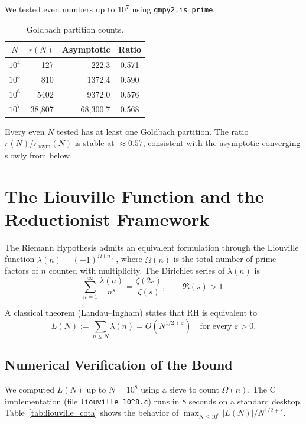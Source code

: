 \documentclass[12pt,a4paper]{article}
\theoremstyle{plain}
\begin{document}
We tested even numbers up to $10^7$ using {\tt gmpy2.is\_prime}.

\begin{table}[htbp]
\centering
\caption{Goldbach partition counts.}
\label{tab:goldbach}
\begin{tabular}{crrc}
\hline
$N$ & $r(N)$ & Asymptotic & Ratio \\
\hline
$10^4$ & 127 & 222.3 & 0.571 \\
$10^5$ & 810 & 1372.4 & 0.590 \\
$10^6$ & 5402 & 9372.0 & 0.576 \\
$10^7$ & 38,807 & 68,300.7 & 0.568 \\
\hline
\end{tabular}
\end{table}

Every even $N$ tested has at least one Goldbach partition.
The ratio $r(N)/r_{\text{asym}}(N)$ is stable at $\approx0.57$,
consistent with the asymptotic converging slowly from below.

\section{The Liouville Function and the Reductionist Framework}
\label{sec:liouville}

The Riemann Hypothesis admits an equivalent formulation through the
Liouville function $\lambda(n)=(-1)^{\Omega(n)}$, where $\Omega(n)$ is
the total number of prime factors of $n$ counted with multiplicity.
The Dirichlet series of $\lambda(n)$ is
\[
\sum_{n=1}^{\infty}\frac{\lambda(n)}{n^{s}} = \frac{\zeta(2s)}{\zeta(s)},\qquad
\Re(s)>1.
\]

A classical theorem (Landau--Ingham) states that RH is equivalent to
\[
\boxed{L(N):=\sum_{n\le N}\lambda(n)=O(N^{1/2+\varepsilon})\quad\text{for every }
\varepsilon>0.}
\]

\subsection{Numerical Verification of the Bound}

We computed $L(N)$ up to $N=10^{8}$ using a sieve to count $\Omega(n)$.
The C implementation (file {\tt liouville\_10\^{}8.c}) runs in 8 seconds
on a standard desktop.  Table~\ref{tab:liouville_cota} shows the
behavior of $\max_{N\le10^{8}}|L(N)|/N^{1/2+\varepsilon}$.
\end{document}
